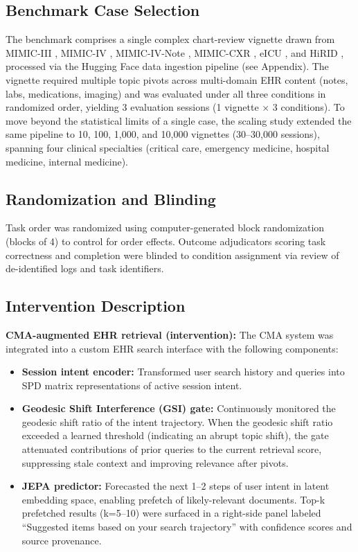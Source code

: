 \documentclass[preprint,12pt]{elsarticle}
\begin{document}
\subsection{Benchmark Case Selection}
The benchmark comprises a single complex chart-review vignette drawn from MIMIC-III \citep{johnson2016_mimic3}, MIMIC-IV \citep{pollard2018_mimic4}, MIMIC-IV-Note \citep{johnson2023_mimiciv_note}, MIMIC-CXR \citep{johnson2019_mimic_cxr}, eICU \citep{pollard2018_eicu}, and HiRID \citep{muller2021_hirid}, processed via the Hugging Face data ingestion pipeline (see Appendix). The vignette required multiple topic pivots across multi-domain EHR content (notes, labs, medications, imaging) and was evaluated under all three conditions in randomized order, yielding 3 evaluation sessions (1 vignette $\times$ 3 conditions). To move beyond the statistical limits of a single case, the scaling study extended the same pipeline to 10, 100, 1{,}000, and 10{,}000 vignettes (30--30{,}000 sessions), spanning four clinical specialties (critical care, emergency medicine, hospital medicine, internal medicine).

\subsection{Randomization and Blinding}
Task order was randomized using computer-generated block randomization (blocks of 4) to control for order effects. Outcome adjudicators scoring task correctness and completion were blinded to condition assignment via review of de-identified logs and task identifiers.

\subsection{Intervention Description}

\textbf{CMA-augmented EHR retrieval (intervention):} The CMA system was integrated into a custom EHR search interface with the following components:
\begin{itemize}
  \item \textbf{Session intent encoder:} Transformed user search history and queries into SPD matrix representations of active session intent.
  \item \textbf{Geodesic Shift Interference (GSI) gate:} Continuously monitored the geodesic shift ratio of the intent trajectory. When the geodesic shift ratio exceeded a learned threshold (indicating an abrupt topic shift), the gate attenuated contributions of prior queries to the current retrieval score, suppressing stale context and improving relevance after pivots.
  \item \textbf{JEPA predictor:} Forecasted the next 1--2 steps of user intent in latent embedding space, enabling prefetch of likely-relevant documents. Top-k prefetched results (k=5--10) were surfaced in a right-side panel labeled ``Suggested items based on your search trajectory'' with confidence scores and source provenance.
\end{itemize}
\end{document}
